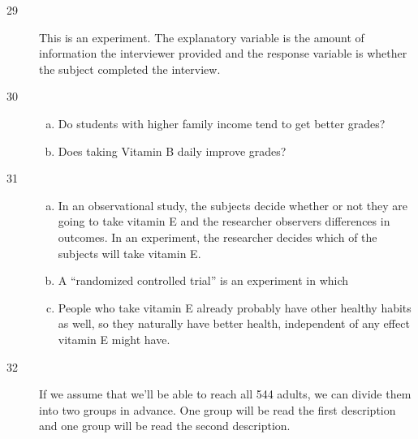 \documentclass[letterpaper, landscape]{exam}
\begin{document}
  \ifprintanswers
    \begin{description}

      \item[29] 
        This is an experiment.  The explanatory variable is the amount of
        information the interviewer provided and the response variable is
        whether the subject completed the interview.

      \item[30]
        \begin{enumerate}[(a)]
          \item Do students with higher family income tend to get better grades?

          \item Does taking Vitamin B daily improve grades?
        \end{enumerate}

      \item[31]
        \begin{enumerate}[(a)]
          \item In an observational study, the subjects decide whether or not
            they are going to take vitamin E and the researcher observers
            differences in outcomes.  In an experiment, the researcher decides
            which of the subjects will take vitamin E.

          \item A ``randomized controlled trial'' is an experiment in which 

          \item People who take vitamin E already probably have other healthy
            habits as well, so they naturally have better health, independent of
            any effect vitamin E might have.
        \end{enumerate}

      \item[32] If we assume that we'll be able to reach all 544 adults, we can
        divide them into two groups in advance.  One group will be read the
        first description and one group will be read the second description.


\end{description}
\end{document}
